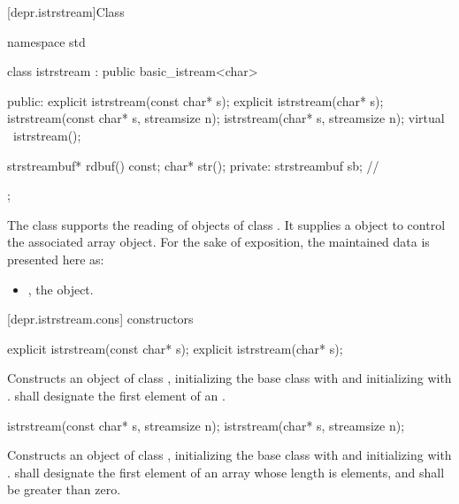 [depr.istrstream]{Class }

%
\begin{codeblock}
namespace std {
  class istrstream : public basic_istream<char> {
  public:
    explicit istrstream(const char* s);
    explicit istrstream(char* s);
    istrstream(const char* s, streamsize n);
    istrstream(char* s, streamsize n);
    virtual ~istrstream();

    strstreambuf* rdbuf() const;
    char* str();
  private:
    strstreambuf sb;  // \expos
  };
}
\end{codeblock}

\pnum
The class
supports the reading of objects of class
.
It supplies a
object to control the associated array object.
For the sake of exposition, the maintained data is presented here as:

\begin{itemize}
\item
{}, the  object.
\end{itemize}

[depr.istrstream.cons]{ constructors}

%
\begin{itemdecl}
explicit istrstream(const char* s);
explicit istrstream(char* s);
\end{itemdecl}

\begin{itemdescr}
\pnum
\effects
Constructs an object of class
,
initializing the base class with
and initializing  with
.
 shall designate the first element of an \ntbs{}.%
\end{itemdescr}

%
\begin{itemdecl}
istrstream(const char* s, streamsize n);
istrstream(char* s, streamsize n);
\end{itemdecl}

\begin{itemdescr}
\pnum
\effects
Constructs an object of class
,
initializing the base class with
and initializing  with
.
 shall designate the first element of an array whose length is
 elements, and  shall be greater than zero.
\end{itemdescr}

